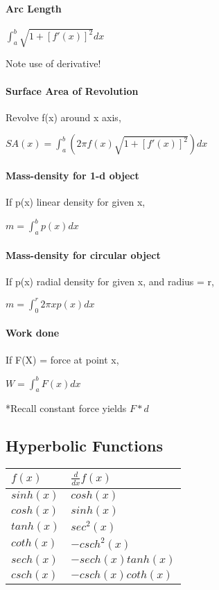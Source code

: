 \documentclass[10pt,landscape]{article}
\begin{document}
\begin{multicols}{4}
\paragraph{Arc Length}

$\int_{a}^{b} \sqrt{1+[f'(x)]^2}dx$

Note use of derivative!

\paragraph{Surface Area of Revolution}

Revolve f(x) around x axis,

$SA(x) = \int_{a}^{b}(2 \pi f(x) \sqrt{1+[f'(x)]^2})dx$

\paragraph{Mass-density for 1-d object}

If p(x) linear density for given x,

$m = \int_{a}^{b}p(x)dx$

\paragraph{Mass-density for circular object}

If p(x) radial density for given x, and radius = r,

$m = \int_{0}^{r}2 \pi x p(x)dx$

\paragraph{Work done}

If F(X) = force at point x,

$W = \int_{a}^{b} F(x) dx$

*Recall constant force yields $F*d$

\subsection{Hyperbolic Functions}

\begin{tabular}{l l}
$f(x)$ & $\frac{d}{dx}f(x)$ \\
\hline
$sinh(x)$ & $cosh(x)$ \\
$cosh(x)$ & $sinh(x)$ \\
$tanh(x)$ & $sec^2(x)$ \\
$coth(x)$ & $-csch^2(x)$ \\
$sech(x)$ & $-sech(x)tanh(x)$ \\
$csch(x)$ & $-csch(x)coth(x)$ \\
\hline
\end{tabular}


\end{multicols}
\end{document}
